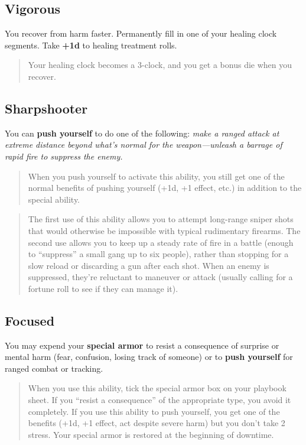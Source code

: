 \documentclass[11pt,fleqn,a5paper]{book}
\begin{document}
\subsection{Vigorous}

You recover from harm faster. Permanently fill in one of your healing clock segments. Take \textbf{+1d} to healing treatment rolls.

\begin{quote}
	Your healing clock becomes a 3-clock, and you get a bonus die when you recover.
\end{quote} 

\subsection{Sharpshooter}

You can \textbf{push yourself} to do one of the following: \emph{make a ranged attack at extreme distance beyond what’s normal for the weapon---unleash a barrage of rapid fire to suppress the enemy.}

\begin{quote}
	When you push yourself to activate this ability, you still get one of the normal benefits of pushing yourself (+1d, +1 effect, etc.) in addition to the special ability.
\end{quote} 

\begin{quote}
	The first use of this ability allows you to attempt long-range sniper shots that would otherwise be impossible with  typical rudimentary firearms. The second use allows you to keep up a steady rate of fire in a battle (enough to “suppress” a small gang up to six people), rather than stopping for a slow reload or discarding a gun after each shot. When an enemy is suppressed, they’re reluctant to maneuver or attack (usually calling for a fortune roll to see if they can manage it).
\end{quote} 

\subsection{Focused}

You may expend your \textbf{special armor} to resist a consequence of surprise or mental harm (fear, confusion, losing track of someone) or to \textbf{push yourself} for ranged combat or tracking.

\begin{quote}
	When you use this ability, tick the special armor box on your playbook sheet. If you “resist a consequence” of the appropriate type, you avoid it completely. If you use this ability to push yourself, you get one of the benefits (+1d, +1 effect, act despite severe harm) but you don’t take 2 stress. Your special armor is restored at the beginning of downtime.
\end{quote} 
\end{document}
